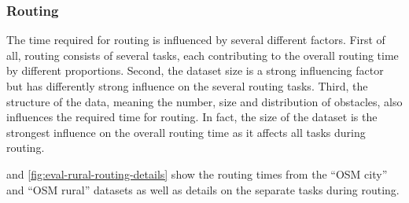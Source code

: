 	
		\subsubsection{Routing}
		
			The time required for routing is influenced by several different factors.
			First of all, routing consists of several tasks, each contributing to the overall routing time by different proportions.
			Second, the dataset size is a strong influencing factor but has differently strong influence on the several routing tasks.
			Third, the structure of the data, meaning the number, size and distribution of obstacles, also influences the required time for routing.
			In fact, the size of the dataset is the strongest influence on the overall routing time as it affects all tasks during routing.
			
			 and \ref{fig:eval-rural-routing-details} show the routing times from the \enquote{OSM city} and \enquote{OSM rural} datasets as well as details on the separate tasks during routing.
		

